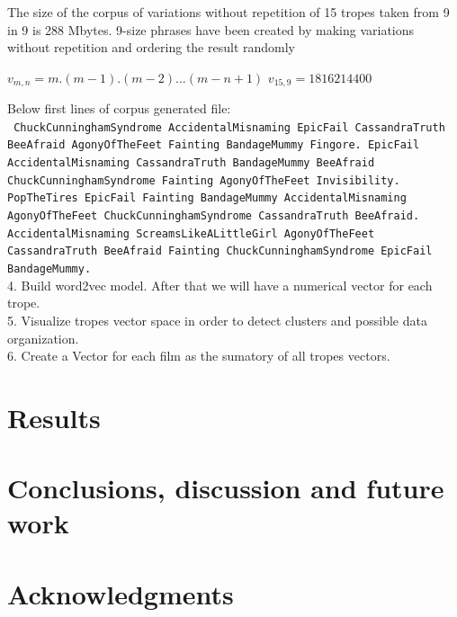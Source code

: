 \documentclass[letterpaper]{article}
\begin{document}
	The size of the corpus of variations without repetition of 15 tropes taken from 9 in 9 is 288 Mbytes. 9-size phrases have been created by making variations without repetition and ordering the result randomly \\
	
	\begin{center}
		
		${v}_{m,n} = m.(m-1).(m-2)...(m-n+1)$
		${v}_{15,9} = 1816214400$
		
	\end{center}
	
	Below first lines of corpus generated file:\\
	\texttt{    
		ChuckCunninghamSyndrome AccidentalMisnaming EpicFail CassandraTruth BeeAfraid AgonyOfTheFeet Fainting BandageMummy Fingore. EpicFail AccidentalMisnaming CassandraTruth BandageMummy BeeAfraid ChuckCunninghamSyndrome Fainting AgonyOfTheFeet Invisibility. PopTheTires EpicFail Fainting BandageMummy AccidentalMisnaming AgonyOfTheFeet ChuckCunninghamSyndrome CassandraTruth BeeAfraid. AccidentalMisnaming ScreamsLikeALittleGirl AgonyOfTheFeet CassandraTruth BeeAfraid Fainting ChuckCunninghamSyndrome EpicFail BandageMummy.}\\
	
	
	
	
	4. Build word2vec model. After that we will have a numerical vector for each trope. \\
	5. Visualize tropes vector space in order to detect clusters and possible data organization. \\ 
	6. Create a Vector for each film as the sumatory of all tropes vectors. \\
	
	\section{Results}
	\label{sec:res}
	
	\section{Conclusions, discussion and future work}
	
	\section{Acknowledgments}
	
	
	
	
\end{document}
